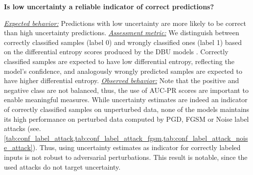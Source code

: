 \begin{center}
	\textbf{Is low uncertainty a reliable indicator of correct predictions?}
\end{center}
\underline{\emph{Expected behavior:}}  Predictions with low uncertainty are more likely to be correct than high uncertainty predictions. 
\underline{\emph{Assessment metric:}} We distinguish between correctly classified samples (label 0) and wrongly classified ones (label 1) based on the differential entropy scores produced by the DBU models \citep{malini2018}. Correctly classified samples are expected to have low differential entropy, reflecting the model's confidence, and analogously wrongly predicted samples are expected to have higher differential entropy. 
\underline{\emph{Observed behavior:}} Note that the positive and negative class are not balanced, thus, the use of AUC-PR scores \citep{imbalance_apr} are important to enable meaningful measures. While uncertainty estimates are indeed an indicator of correctly classified samples on unperturbed data, none of the models maintains its high performance on perturbed data computed by PGD, FGSM or Noise label attacks (see. \cref{tab:conf_label_attack,tab:conf_label_attack_fgsm,tab:conf_label_attack_noise_attack}). Thus, using uncertainty estimates as indicator for correctly labeled inputs is not robust to adversarial perturbations. This result is notable, since the used attacks do not target uncertainty. 






